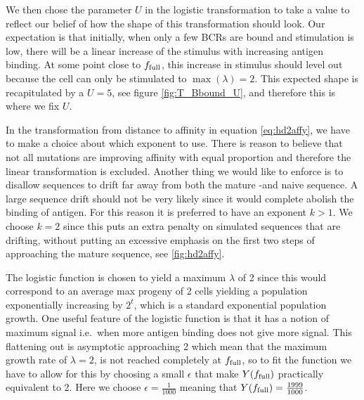 We then chose the parameter $U$ in the logistic transformation to take a value to reflect our belief of how the shape of this transformation should look.
Our expectation is that initially, when only a few BCRs are bound and stimulation is low, there will be a linear increase of the stimulus with increasing antigen binding.
At some point close to $f_{\text{full}}$, this increase in stimulus should level out because the cell can only be stimulated to $\operatorname{max}(\lambda)=2$.
This expected shape is recapitulated by a $U=5$, see figure \ref{fig:T_Bbound_U}, and therefore this is where we fix $U$.

In the transformation from distance to affinity in equation \ref{eq:hd2affy}, we have to make a choice about which exponent to use.
There is reason to believe that not all mutations are improving affinity with equal proportion and therefore the linear transformation is excluded.
Another thing we would like to enforce is to disallow sequences to drift far away from both the mature -and naive sequence.
A large sequence drift should not be very likely since it would complete abolish the binding of antigen.
For this reason it is preferred to have an exponent $k>1$.
We choose $k=2$ since this puts an extra penalty on simulated sequences that are drifting, without putting an excessive emphasis on the first two steps of approaching the mature sequence, see \ref{fig:hd2affy}.

The logistic function is chosen to yield a maximum $\lambda$ of 2 since this would correspond to an average max progeny of 2 cells yielding a population exponentially increasing by $2^t$, which is a standard exponential population growth.
One useful feature of the logistic function is that it has a notion of maximum signal i.e.\ when more antigen binding does not give more signal.
This flattening out is asymptotic approaching 2 which mean that the maximum growth rate of $\lambda=2$, is not reached completely at $f_{\text{full}}$, so to fit the function we have to allow for this by choosing a small $\epsilon$ that make $Y(f_{\text{full}})$ practically equivalent to 2.
Here we choose $\epsilon=\frac{1}{1000}$ meaning that $Y(f_{\text{full}}) = \frac{1999}{1000}$.

